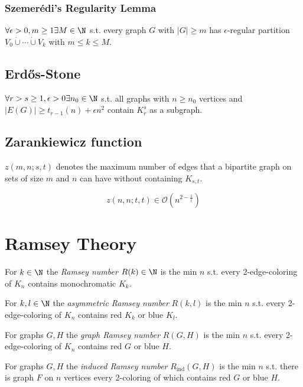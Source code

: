\subsubsection*{Szemer\'{e}di's Regularity Lemma}

$\forall \epsilon > 0, m \geq 1 \exists M \in \N$ s.t. every graph $G$ with $|G| \geq m$ has $\epsilon$-regular partition $V_0 \dot\cup\cdots\dot\cup V_k$ with $m \leq k \leq M$.

\subsection*{Erd\H{o}s-Stone}

$\forall r > s \geq 1, \epsilon > 0 \exists n_0 \in \N$ s.t. all graphs with $n \geq n_0$ vertices and $|E(G)| \geq t_{r-1}(n)+\epsilon n^2$ contain $K_r^s$ as a subgraph.

\subsection*{Zarankiewicz function}

$z(m,n;s,t)$ denotes the maximum number of edges that a bipartite graph on sets of size $m$ and $n$ can have without containing $K_{s,t}$.

$$z(n,n;t,t) \in \mathcal{O}(n^{2-\frac{1}{t}})$$

\section*{Ramsey Theory}

For $k \in \N$ the \emph{Ramsey number} $R(k) \in \N$ is the min $n$ s.t. every 2-edge-coloring of $K_n$ contains monochromatic $K_k$.

\spacing

For $k, l \in \N$ the \emph{asymmetric Ramsey number} $R(k,l)$ is the min $n$ s.t. every 2-edge-coloring of $K_n$ contains red $K_k$ or blue $K_l$.

\spacing

For graphs $G, H$ the \emph{graph Ramsey number} $R(G,H)$ is the min $n$ s.t. every 2-edge-coloring of $K_n$ contains red $G$ or blue $H$.

\spacing

For graphs $G, H$ the \emph{induced Ramsey number} $R_\text{ind}(G,H)$ is the min $n$ s.t. there is graph $F$ on $n$ vertices every 2-coloring of which contains red $G$ or blue $H$.

\spacing

